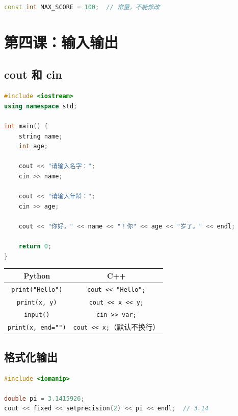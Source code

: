 \documentclass[a4paper,12pt]{ctexart}
\begin{document}
\begin{lstlisting}[language=C++]
const int MAX_SCORE = 100;  // 常量，不能修改
\end{lstlisting}

\section*{第四课：输入输出}

\subsection*{cout 和 cin}

\begin{lstlisting}[language=C++]
#include <iostream>
using namespace std;

int main() {
    string name;
    int age;
    
    cout << "请输入名字：";
    cin >> name;
    
    cout << "请输入年龄：";
    cin >> age;
    
    cout << "你好，" << name << "！你" << age << "岁了。" << endl;
    
    return 0;
}
\end{lstlisting}

\begin{center}
\begin{tabular}{|c|c|}
\hline
\textbf{Python} & \textbf{C++} \\ \hline
\texttt{print("Hello")} & \texttt{cout << "Hello";} \\ \hline
\texttt{print(x, y)} & \texttt{cout << x << y;} \\ \hline
\texttt{input()} & \texttt{cin >> var;} \\ \hline
\texttt{print(x, end="")} & \texttt{cout << x;}（默认不换行） \\ \hline
\end{tabular}
\end{center}

\subsection*{格式化输出}

\begin{lstlisting}[language=C++]
#include <iomanip>

double pi = 3.1415926;
cout << fixed << setprecision(2) << pi << endl;  // 3.14
\end{lstlisting}
\end{document}

